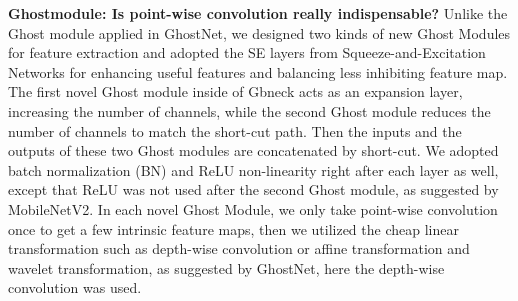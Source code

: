\textbf{Ghostmodule: Is point-wise convolution really indispensable?} Unlike the Ghost module applied in GhostNet\cite{19}, we designed two kinds of new Ghost Modules for feature extraction and adopted the SE layers from Squeeze-and-Excitation Networks \cite{24} for enhancing useful features and balancing less inhibiting feature map. The first novel Ghost module inside of Gbneck acts as an expansion layer, increasing the number of channels, while the second Ghost module reduces the number of channels to match the short-cut path. Then the inputs and the outputs of these two Ghost modules are concatenated by short-cut. We adopted batch normalization (BN) and ReLU non-linearity right after each layer as well\cite{19}, except that ReLU was not used after the second Ghost module, as suggested by MobileNetV2\cite{30}. In each novel Ghost Module, we only take point-wise convolution once to get a few intrinsic feature maps, then we utilized the cheap linear transformation such as depth-wise convolution or affine transformation and wavelet transformation, as suggested by GhostNet\cite{19}, here the depth-wise convolution was used.

